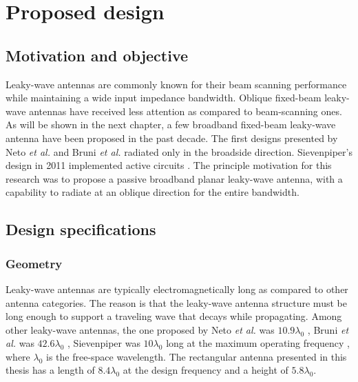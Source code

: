 
\section{Proposed design}

\subsection{Motivation and objective}
Leaky-wave antennas are commonly known for their beam scanning performance while maintaining a wide input impedance bandwidth. Oblique fixed-beam leaky-wave antennas have received less attention as compared to beam-scanning ones. As will be shown in the next chapter, a few broadband fixed-beam leaky-wave antenna have been proposed in the past decade. The first designs presented by Neto \textit{et al.} \cite{Neto2005} and Bruni \textit{et al.} \cite{Bruni2007} radiated only in the broadside direction. Sievenpiper's design in 2011 implemented active circuits \cite{Sievenpiper2011}. The principle motivation for this research was to propose a passive broadband planar leaky-wave antenna, with a capability to radiate at an oblique direction for the entire bandwidth.

\subsection{Design specifications}
\subsubsection{Geometry}
Leaky-wave antennas are typically electromagnetically long as compared to other antenna categories. The reason is that the leaky-wave antenna structure must be long enough to support a traveling wave that decays while propagating. Among other leaky-wave antennas, the one proposed by Neto \textit{et al.} was $10.9 \lambda_0$ \cite{Neto2005}, Bruni \textit{et al.} was $42.6 \lambda_0$ \cite{Bruni2007}, Sievenpiper was $10 \lambda_0$ long at the maximum operating frequency \cite{Sievenpiper2011}, where $\lambda_0$ is the free-space wavelength. The rectangular antenna presented in this thesis has a length of $8.4 \lambda_0$ at the design frequency and a height of $5.8 \lambda_0$.

